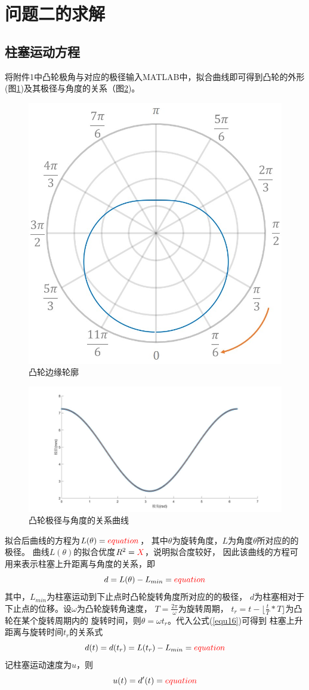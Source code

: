 \documentclass[withoutpreface,bwprint]{cumcmthesis} %
\begin{document}
\section{问题二的求解}
\subsection{柱塞运动方程}
    将附件1中凸轮极角与对应的极径输入MATLAB中，拟合曲线即可得到凸轮的外形
    (图\ref{figure10})及其极径与角度的关系（图\ref{figure11})。
    \begin{figure}[!h]
        \centering
        \includegraphics[width=.3\textwidth]{wheel.jpg}
        \caption{凸轮边缘轮廓}
        \label{figure10}
    \end{figure}
    \begin{figure}[htbp]
        \centering
        \includegraphics[width=.9\textwidth]{wheel_equ.jpg}
        \caption{凸轮极径与角度的关系曲线}
        \label{figure11}
    \end{figure}
    
    拟合后曲线的方程为$L(\theta)={\color{red}equation}$，
    其中$\theta$为旋转角度，$L$为角度$\theta$所对应的的极径。
    曲线$L(\theta)$的拟合优度$R^2={\color{red}X}$，说明拟合度较好，
    因此该曲线的方程可用来表示柱塞上升距离与角度的关系，即
    \begin{equation}
        d=L(\theta)-L_{min}={\color{red}equation}
    \label{equ16}
    \end{equation}
    其中，$L_{min}$为柱塞运动到下止点时凸轮旋转角度所对应的的极径，
    $d$为柱塞相对于下止点的位移。设$\omega$为凸轮旋转角速度，
    $T=\frac{2\pi}{\omega}$为旋转周期，
    $t_r=t-\lfloor{\frac{t}{T}*T}\rfloor$为凸轮在某个旋转周期内的
    旋转时间，则$\theta=\omega t_r$。代入公式(\ref{equ16})可得到
    柱塞上升距离与旋转时间$t_r$的关系式
    \begin{equation}
        d(t)=d(t_r)=L(t_r)-L_{min}={\color{red}equation}
    \label{equ17}
    \end{equation}
    记柱塞运动速度为$u$，则
    \begin{equation}
        u(t)=d'(t)={\color{red}equation}
    \label{equ18}
    \end{equation}  
   
\end{document}
